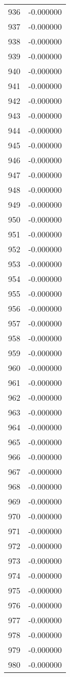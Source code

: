 \documentclass[12pt]{article}
\begin{document}
\begin{longtable}{@{}cc@{}}
936 & -0.000000 \\
937 & -0.000000 \\
938 & -0.000000 \\
939 & -0.000000 \\
940 & -0.000000 \\
941 & -0.000000 \\
942 & -0.000000 \\
943 & -0.000000 \\
944 & -0.000000 \\
945 & -0.000000 \\
946 & -0.000000 \\
947 & -0.000000 \\
948 & -0.000000 \\
949 & -0.000000 \\
950 & -0.000000 \\
951 & -0.000000 \\
952 & -0.000000 \\
953 & -0.000000 \\
954 & -0.000000 \\
955 & -0.000000 \\
956 & -0.000000 \\
957 & -0.000000 \\
958 & -0.000000 \\
959 & -0.000000 \\
960 & -0.000000 \\
961 & -0.000000 \\
962 & -0.000000 \\
963 & -0.000000 \\
964 & -0.000000 \\
965 & -0.000000 \\
966 & -0.000000 \\
967 & -0.000000 \\
968 & -0.000000 \\
969 & -0.000000 \\
970 & -0.000000 \\
971 & -0.000000 \\
972 & -0.000000 \\
973 & -0.000000 \\
974 & -0.000000 \\
975 & -0.000000 \\
976 & -0.000000 \\
977 & -0.000000 \\
978 & -0.000000 \\
979 & -0.000000 \\
980 & -0.000000 \\

\end{longtable}
\end{document}
